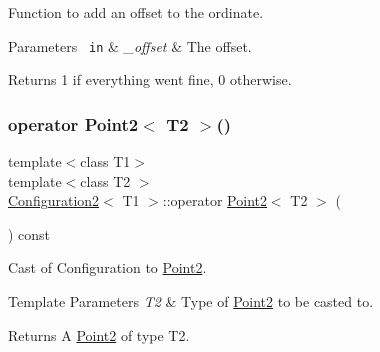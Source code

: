 Function to add an offset to the ordinate. 


\begin{DoxyParams}[1]{Parameters}
\mbox{\texttt{ in}}  & {\em \+\_\+offset} & The offset. \\
\hline
\end{DoxyParams}
\begin{DoxyReturn}{Returns}
1 if everything went fine, 0 otherwise. 
\end{DoxyReturn}
\mbox{\label{class_configuration2_a68bfa8b94c1cff3179698e00edb2890e}} 
\subsubsection{\texorpdfstring{operator Point2$<$ T2 $>$()}{operator Point2< T2 >()}}
{\footnotesize\ttfamily template$<$class T1$>$ \\
template$<$class T2 $>$ \\
\mbox{\hyperlink{class_configuration2}{Configuration2}}$<$ T1 $>$\+::operator \mbox{\hyperlink{class_point2}{Point2}}$<$ T2 $>$ (\begin{DoxyParamCaption}{ }\end{DoxyParamCaption}) const\hspace{0.3cm}{\ttfamily [inline]}}



Cast of Configuration to \mbox{\hyperlink{class_point2}{Point2}}. 


\begin{DoxyTemplParams}{Template Parameters}
{\em T2} & Type of \mbox{\hyperlink{class_point2}{Point2}} to be casted to. \\
\hline
\end{DoxyTemplParams}
\begin{DoxyReturn}{Returns}
A \mbox{\hyperlink{class_point2}{Point2}} of type T2. 
\end{DoxyReturn}
\mbox{\label{class_configuration2_a9ef2f57ddcc1f0c8117a9ed2f13141aa}} 
